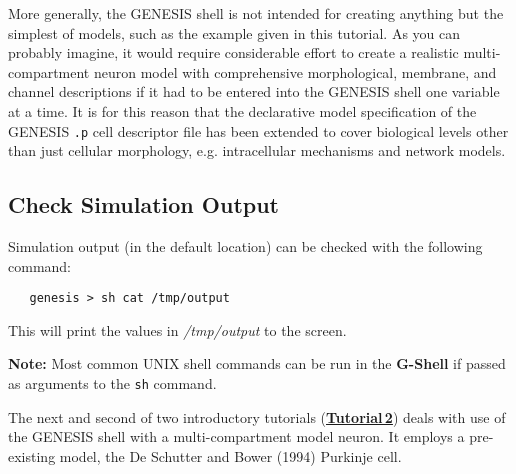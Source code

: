 \documentclass[12pt]{article}
\begin{document}
More generally, the GENESIS shell is not intended for creating anything but the simplest of models, such as the example given in this tutorial.  As you can probably imagine, it would require considerable effort to create a realistic multi-compartment neuron model with comprehensive morphological, membrane, and channel descriptions if it had to be entered into the GENESIS shell one variable at a time. It is for this reason that the declarative model specification of the GENESIS {\tt.p} cell descriptor file has been extended to cover biological levels other than just cellular morphology, e.g. intracellular mechanisms and network models.

\subsection*{Check Simulation Output}

Simulation output (in the default location) can be checked with the following command:
\begin{verbatim}
   genesis > sh cat /tmp/output
\end{verbatim}
This will print the values in {\it /tmp/output} to the screen.

{\bf Note:} Most common UNIX shell commands can be run in the {\bf G-Shell} if passed as arguments to the {\tt sh} command.

The next and second of two introductory tutorials (\href{../tutorial2/tutorial2.tex}{\bf Tutorial\,2}) deals with use of the GENESIS shell with a multi-compartment model neuron. It employs a pre-existing model, the De Schutter and Bower (1994) Purkinje cell.
\end{document}
